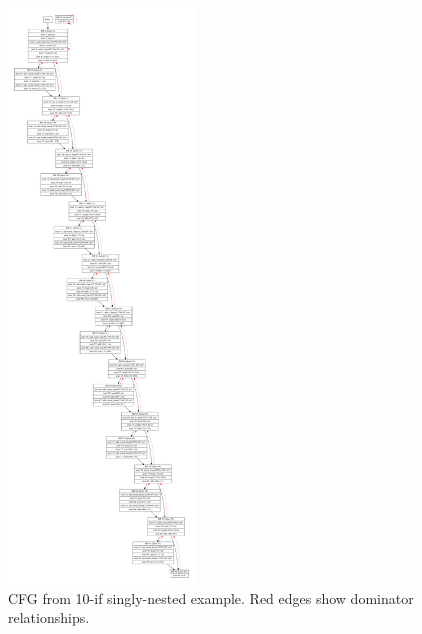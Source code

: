 \documentclass[10pt,twocolumn]{article}
\begin{document}
\begin{figure}
\begin{center}
  \includegraphics[height=6in]{figs/nested-if-10-1.pdf}
  \caption{CFG from 10-if singly-nested example. Red edges show dominator relationships.}
  \label{fig:nest-10-1}
\end{center}
\end{figure}
\end{document}
